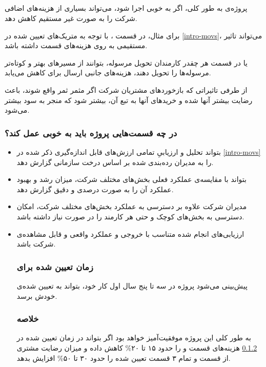 \documentclass[12pt, dvipsnames, svgnames, x11names,]{article}
\begin{document}
\subsection{}

پروژه‌ی  به طور کلی، اگر به خوبی اجرا شود، می‌تواند بسیاری از هزینه‌های اضافی شرکت  را به صورت غیر مستقیم کاهش دهد.

برای مثال، در قسمت ، با توجه به متریک‌های تعیین شده در \ref{intro-movs}، 
می‌تواند تاثیر مستقیمی به روی هزینه‌های قسمت  داشته باشد.

یا در قسمت  هر چقدر کارمندان تحویل مرسوله، بتوانند از مسیر‌های بهتر و کوتاه‌تر مرسوله‌ها را تحویل دهند، هزینه‌های جانبی ارسال برای  کاهش می‌یابد.

از طرفی تاثیراتی که بازخورد‌های مشتریان شرکت اگر مثمر ثمر واقع شوند، باعث رضایت بیشتر آنها شده و خرید‌‌های آنها به تبع آن، بیشتر شود که منجر به سود بیشتر 
می‌شود.
\subsubsection{در چه قسمت‌هایی پروژه باید به خوبی عمل کند؟}
\begin{itemize}
    \item 
    بتواند تحلیل و ارزیابیِ تمامی ارزش‌های قابل‌ اندازه‌گیری ذکر شده در \ref{intro-movs} را به مدیران رده‌بندی‌ شده بر اساس درخت سازمانی گزارش دهد.
    \item 
    بتواند با مقایسه‌ی عملکرد فعلی بخش‌های مختلف شرکت، میزان رشد و بهبود عملکرد آن را به صورت درصدی و دقیق گزارش دهد.
    \item
    مدیران شرکت علاوه‌ بر دسترسی به عملکرد بخش‌های مختلف شرکت، امکان دسترسی به بخش‌های کوچک و حتی هر کارمند را در صورت نیاز داشته باشد.
    
    \item 
    ارزیابی‌های انجام شده متناسب‌ با خروجی و عملکرد واقعی و قابل مشاهده‌ی شرکت باشد.
    
    \subsubsection{زمان تعیین شده برای }\label{time}
    پیش‌بینی می‌شود پروژه در سه تا پنج سال اول کار خود، بتواند به  تعیین شده‌ی خودش برسد.
    \subsubsection{خلاصه‌} 
    به طور کلی این پروژه موفقیت‌آمیز خواهد بود اگر بتواند در زمان تعیین شده در \ref{time}
    هزینه‌های قسمت  و 
    را حدود ۱۵ تا ۲۰\% کاهش داده و میزان رضایت مشتری از قسمت  و تمام ۳ قسمت تعیین شده را حدود ۳۰ تا ۵۰\% افزایش بدهد.
\end{itemize}
\end{document}

